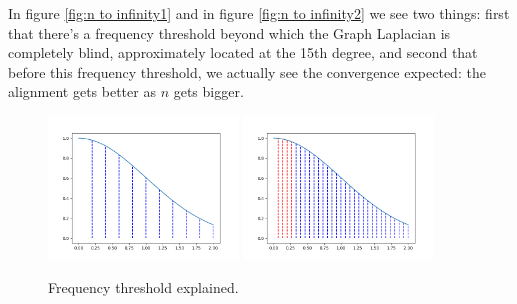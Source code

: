 In figure \ref{fig:n to infinity1} and in figure \ref{fig:n to infinity2} we see two things: first that there's a frequency threshold beyond which the Graph Laplacian is completely blind, approximately located at the 15th degree, and second that before this frequency threshold, we actually see the convergence expected: the alignment gets better as $n$ gets bigger.

\begin{figure}[h!]
	\centering
	\includegraphics[width=0.45\textwidth]{figs/chapter1/frequency_threshold1.png}	\hfill
	\includegraphics[width=0.45\textwidth]{figs/chapter1/frequency_threshold2.png}	
	\caption{\label{fig:n to infinity4}Frequency threshold explained.}
\end{figure}

